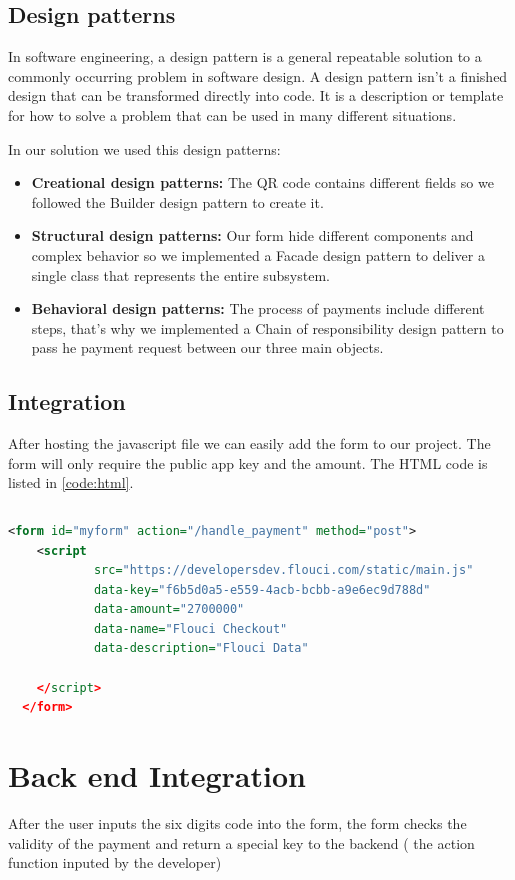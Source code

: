 \begin{spacing}{1.2}
\subsection{Design patterns}
In software engineering, a design pattern\cite{designpattern} is a general repeatable solution to a commonly occurring problem in software design. A design pattern isn't a finished design that can be transformed directly into code. It is a description or template for how to solve a problem that can be used in many different situations.

In our solution we used this design patterns:
\begin{itemize}
	\item \textbf{Creational design patterns:} The QR code contains different fields so we followed the Builder design pattern to create it.
	\item \textbf{Structural design patterns:} Our form hide different components and complex behavior so we implemented a Facade design pattern to deliver a single class that 
	 represents the entire subsystem.
	 \item \textbf{Behavioral design patterns:} The process of payments include different steps, that's why we implemented a  Chain of responsibility design pattern to pass he payment request between our three main objects.
\end{itemize}
\subsection{Integration}
After hosting the javascript file we can easily add the form to our project. The form will only require the public app key  and the amount.
The HTML code is listed in \ref{code:html}.
\begin{lstlisting}[rulecolor=\color{white}]
\end{lstlisting}
\begin{lstlisting}[label=code:html,caption=Flouci Integration Java,language=xml]
 <form id="myform" action="/handle_payment" method="post">
    <script
            src="https://developersdev.flouci.com/static/main.js"
            data-key="f6b5d0a5-e559-4acb-bcbb-a9e6ec9d788d"
            data-amount="2700000"
            data-name="Flouci Checkout"
            data-description="Flouci Data"

    </script>
  </form>
\end{lstlisting}


\section{Back end Integration}
After the user inputs the six digits code into the form, the form checks the validity of the payment and return a special key to the backend ( the action function inputed by the developer)


\end{spacing}
